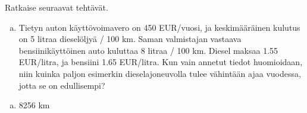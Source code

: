 \begin{tehtava}
    Ratkaise seuraavat tehtävät.
    \begin{enumerate}[a)]
        \item Tietyn auton käyttövoimavero on 450 EUR/vuosi, ja keskimääräinen kulutus on 5 litraa dieselöljyä / 100 km. Saman valmistajan vastaava bensiinikäyttöinen auto kuluttaa 8 litraa / 100 km. Diesel maksaa 1.55 EUR/litra, ja bensiini 1.65 EUR/litra. Kun vain annetut tiedot huomioidaan, niin kuinka paljon esimerkin dieselajoneuvolla tulee vähintään ajaa vuodessa, jotta se on edullisempi?
    \end{enumerate}

    \begin{vastaus}
        \begin{enumerate}[a)]
            \item 8256 km
        \end{enumerate}
    \end{vastaus}
\end{tehtava}